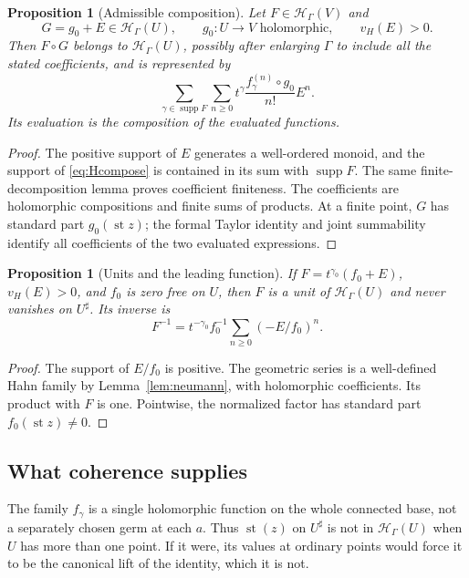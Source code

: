 \documentclass[11pt,a4paper]{article}
\newtheorem{proposition}[theorem]{Proposition}
\theoremstyle{definition}
\theoremstyle{remark}
\newcommand{\HH}{\mathcal H}
\newcommand{\supp}{\operatorname{supp}}
\newcommand{\st}{\operatorname{st}}
\begin{document}
\begin{proposition}[Admissible composition]\label{prop:Hcompose}
Let $F\in\HH_\Gamma(V)$ and
\[
 G=g_0+E\in\HH_\Gamma(U),\qquad
 g_0:U\to V\text{ holomorphic},\qquad v_H(E)>0.
\]
Then $F\circ G$ belongs to $\HH_\Gamma(U)$, possibly after enlarging
$\Gamma$ to include all the stated coefficients, and is represented by
\begin{equation}\label{eq:Hcompose}
 \sum_{\gamma\in\supp F}\sum_{n\ge0}t^\gamma
 \frac{f_\gamma^{(n)}\circ g_0}{n!}E^n.
\end{equation}
Its evaluation is the composition of the evaluated functions.
\end{proposition}
\begin{proof}
The positive support of $E$ generates a well-ordered monoid, and the
support of \eqref{eq:Hcompose} is contained in its sum with $\supp F$.
The same finite-decomposition lemma proves coefficient finiteness.
The coefficients are holomorphic compositions and finite sums of
products. At a finite point, $G$ has standard part $g_0(\st z)$;
the formal Taylor identity and joint summability identify all
coefficients of the two evaluated expressions.
\end{proof}

\begin{proposition}[Units and the leading function]\label{prop:unitforward}
If $F=t^{\gamma_0}(f_0+E)$, $v_H(E)>0$, and $f_0$ is zero free
on $U$, then $F$ is a unit of $\HH_\Gamma(U)$ and never vanishes
on $U^\sharp$. Its inverse is
\[
 F^{-1}=t^{-\gamma_0}f_0^{-1}
       \sum_{n\ge0}(-E/f_0)^n.
\]
\end{proposition}
\begin{proof}
The support of $E/f_0$ is positive. The geometric series is a
well-defined Hahn family by Lemma~\ref{lem:neumann}, with holomorphic
coefficients. Its product with $F$ is one. Pointwise, the normalized
factor has standard part $f_0(\st z)\ne0$.
\end{proof}

\subsection{What coherence supplies}
The family $f_\gamma$ is a single holomorphic function on the whole
connected base, not a separately chosen germ at each $a$. Thus
$\st(z)$ on $U^\sharp$ is not in $\HH_\Gamma(U)$ when $U$ has more
than one point. If it were, its values at ordinary points would force
it to be the canonical lift of the identity, which it is not.
\end{document}
